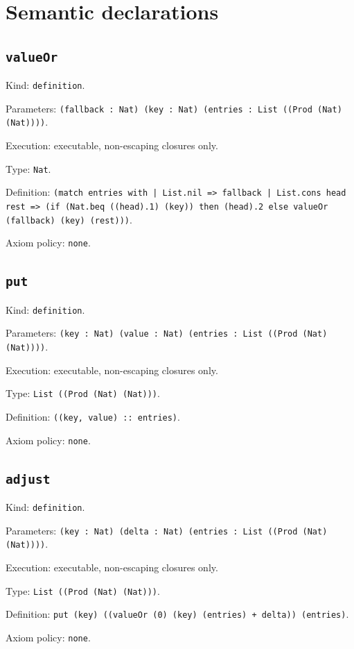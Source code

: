 \documentclass[11pt]{article}
\begin{document}
\section*{Semantic declarations}
\subsection*{\texttt{valueOr}}
\noindent Kind: \texttt{definition}.\par
\noindent Parameters: \texttt{(fallback : Nat) (key : Nat) (entries : List ((Prod (Nat) (Nat))))}.\par
\noindent Execution: executable, non-escaping closures only.\par
\noindent Type: \texttt{Nat}.\par
\noindent Definition: \texttt{(match entries with | List.nil => fallback | List.cons head rest => (if (Nat.beq ((head).1) (key)) then (head).2 else valueOr (fallback) (key) (rest)))}.\par
\noindent Axiom policy: \texttt{none}.\par
\subsection*{\texttt{put}}
\noindent Kind: \texttt{definition}.\par
\noindent Parameters: \texttt{(key : Nat) (value : Nat) (entries : List ((Prod (Nat) (Nat))))}.\par
\noindent Execution: executable, non-escaping closures only.\par
\noindent Type: \texttt{List ((Prod (Nat) (Nat)))}.\par
\noindent Definition: \texttt{((key, value) :: entries)}.\par
\noindent Axiom policy: \texttt{none}.\par
\subsection*{\texttt{adjust}}
\noindent Kind: \texttt{definition}.\par
\noindent Parameters: \texttt{(key : Nat) (delta : Nat) (entries : List ((Prod (Nat) (Nat))))}.\par
\noindent Execution: executable, non-escaping closures only.\par
\noindent Type: \texttt{List ((Prod (Nat) (Nat)))}.\par
\noindent Definition: \texttt{put (key) ((valueOr (0) (key) (entries) + delta)) (entries)}.\par
\noindent Axiom policy: \texttt{none}.\par
\end{document}
